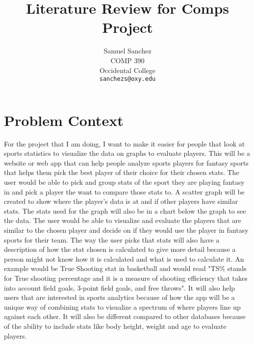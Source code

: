 \documentclass[10pt,twocolumn,letterpaper]{article}
\begin{document}
\title{Literature Review for Comps Project}

\author{Samuel Sanchez\\
COMP 390\\
Occidental College\\
{\tt\small sanchezs@oxy.edu}
}
\maketitle


\section{Problem Context}
\label{sec:Prob Context}

For the project that I am doing, I want to make it easier for people that look at sports statistics to visualize the data on graphs to evaluate players. This will be a website or web app that can help people analyze sports players for fantasy sports that helps them pick the best player of their choice for their chosen stats. The user would be able to pick and group stats of the sport they are playing fantasy in and pick a player the want to compare those stats to. A scatter graph will be created to show where the player's data is at and if other players have similar stats. The stats used for the graph will also be in a chart below the graph to see the data. The user would be able to visualize and evaluate the players that are similar to the chosen player and decide on if they would use the player in fantasy sports for their team. The way the user picks that stats will also have a description of how the stat chosen is calculated to give more detail because a person might not know how it is calculated and what is used to calculate it. An example would be True Shooting stat in basketball and would read "TS\% stands for True shooting percentage and it is a measure of shooting efficiency that takes into account field goals, 3-point field goals, and free throws". It will also help users that are interested in sports analytics because of how the app will be a unique way of combining stats to visualize a spectrum of where players line up against each other. It will also be different compared to other databases because of the ability to include stats like body height, weight and age to evaluate players. 
    
\end{document}
